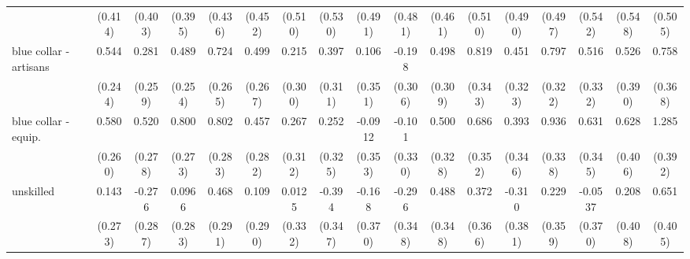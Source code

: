 {\begin{tabular}{l*{16}{c}}
                    &     (0.414)         &     (0.403)         &     (0.395)         &     (0.436)         &     (0.452)         &     (0.510)         &     (0.530)         &     (0.491)         &     (0.481)         &     (0.461)         &     (0.510)         &     (0.490)         &     (0.497)         &     (0.542)         &     (0.548)         &     (0.505)         \\
[1em]
blue collar - artisans&       0.544\sym{*}  &       0.281         &       0.489         &       0.724\sym{**} &       0.499         &       0.215         &       0.397         &       0.106         &      -0.198         &       0.498         &       0.819\sym{*}  &       0.451         &       0.797\sym{*}  &       0.516         &       0.526         &       0.758\sym{*}  \\
                    &     (0.244)         &     (0.259)         &     (0.254)         &     (0.265)         &     (0.267)         &     (0.300)         &     (0.311)         &     (0.351)         &     (0.306)         &     (0.309)         &     (0.343)         &     (0.323)         &     (0.322)         &     (0.332)         &     (0.390)         &     (0.368)         \\
[1em]
blue collar - equip.&       0.580\sym{*}  &       0.520         &       0.800\sym{**} &       0.802\sym{**} &       0.457         &       0.267         &       0.252         &     -0.0912         &      -0.101         &       0.500         &       0.686         &       0.393         &       0.936\sym{**} &       0.631         &       0.628         &       1.285\sym{**} \\
                    &     (0.260)         &     (0.278)         &     (0.273)         &     (0.283)         &     (0.282)         &     (0.312)         &     (0.325)         &     (0.353)         &     (0.330)         &     (0.328)         &     (0.352)         &     (0.346)         &     (0.338)         &     (0.345)         &     (0.406)         &     (0.392)         \\
[1em]
unskilled           &       0.143         &      -0.276         &      0.0966         &       0.468         &       0.109         &      0.0125         &      -0.394         &      -0.168         &      -0.296         &       0.488         &       0.372         &      -0.310         &       0.229         &     -0.0537         &       0.208         &       0.651         \\
                    &     (0.273)         &     (0.287)         &     (0.283)         &     (0.291)         &     (0.290)         &     (0.332)         &     (0.347)         &     (0.370)         &     (0.348)         &     (0.348)         &     (0.366)         &     (0.381)         &     (0.359)         &     (0.370)         &     (0.408)         &     (0.405)         \\

\end{tabular}}
